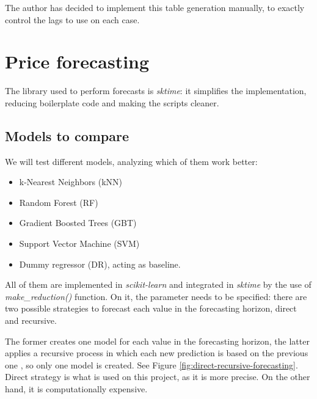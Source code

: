 The author has decided to implement this table generation manually, to exactly control the lags to use on each case.

\section{Price forecasting}
The library used to perform forecasts is \textit{sktime}: it simplifies the implementation, reducing boilerplate code and making the scripts cleaner.

\subsection{Models to compare}
We will test different models, analyzing which of them work better:
\begin{itemize}
    \item k-Nearest Neighbors (kNN)
    \item Random Forest (RF)
    \item Gradient Boosted Trees (GBT)
    \item Support Vector Machine (SVM)
    \item Dummy regressor (DR), acting as baseline.
\end{itemize}
All of them are implemented in \textit{scikit-learn} and integrated in \textit{sktime} by the use of \textit{make\_reduction()} function. On it, the parameter  needs to be specified: there are two possible strategies to forecast each value in the forecasting horizon, direct and recursive.

The former creates one model for each value in the forecasting horizon, the latter applies a recursive process in which each new prediction is based on the previous one \cite{direct-recursive-forecasting}, so only one model is created. See Figure \ref{fig:direct-recursive-forecasting}. Direct strategy is what is used on this project, as it is more precise. On the other hand, it is computationally expensive.

